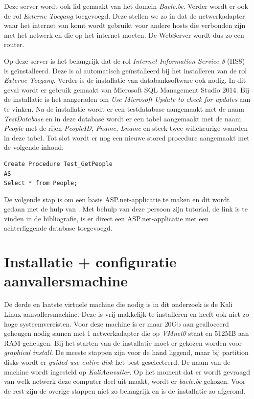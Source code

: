 \documentclass[pdftex,a4paper,12pt]{report}
\begin{document}
Deze server wordt ook lid gemaakt van het domein \textit{Baele.be}. Verder wordt er ook de rol \textit{Externe Toegang} toegevoegd. Deze stellen we zo in dat de netwerkadapter waar het internet van komt wordt gebruikt voor andere hosts die verbonden zijn met het netwerk en die op het internet moeten. De WebServer wordt dus zo een router. \newline

Op deze server is het belangrijk dat de rol \textit{Internet Information Service 8} (IIS8) is geïnstalleerd. Deze is al automatisch geïnstalleerd bij het installeren van de rol \textit{Externe Toegang}. Verder is de installatie van databanksoftware ook nodig. In dit geval wordt er gebruik gemaakt van Microsoft SQL Management Studio 2014. Bij de installatie is het aangeraden om \textit{Use Microsoft Update to check for updates} aan te vinken. Na de installatie wordt er een testdatabase aangemaakt met de naam \textit{TestDatabase} en in deze database wordt er een tabel aangemaakt met de naam \textit{People} met de rijen \textit{PeopleID, Fname, Lname} en steek twee willekeurige waarden in deze tabel. Tot slot wordt er nog een nieuwe stored procedure aangemaakt met de volgende inhoud:
\begin{verbatim}
Create Procedure Test_GetPeople
AS
Select * from People;
\end{verbatim}

De volgende stap is om een basis ASP.net-applicatie te maken en dit wordt gedaan met de hulp van \cite{Nuckolls2011}. Met behulp van deze persoon zijn tutorial, de link is te vinden in de bibliografie, is er direct een ASP.net-applicatie met een achterliggende database toegevoegd. \newline

\section{Installatie + configuratie aanvallersmachine}
De derde en laatste virtuele machine die nodig is in dit onderzoek is de Kali Linux-aanvallersmachine. Deze is vrij makkelijk te installeren en heeft ook niet zo hoge systeemvereisten. Voor deze machine is er maar 20Gb aan gealloceerd geheugen nodig samen met 1 netwerkadapter die op \textit{VMnet0} staat en 512MB aan RAM-geheugen. Bij het starten van de installatie moet er gekozen worden voor \textit{graphical install}. De meeste stappen zijn voor de hand liggend, maar bij partition disks wordt er \textit{guided-use entire disk} het best geselecteerd. De naam van de machine wordt ingesteld op \textit{KaliAanvaller}. Op het moment dat er wordt gevraagd van welk netwerk deze computer deel uit maakt, wordt er \textit{baele.be} gekozen. Voor de rest zijn de overige stappen niet zo belangrijk en is de installatie zo afgerond.
\end{document}
